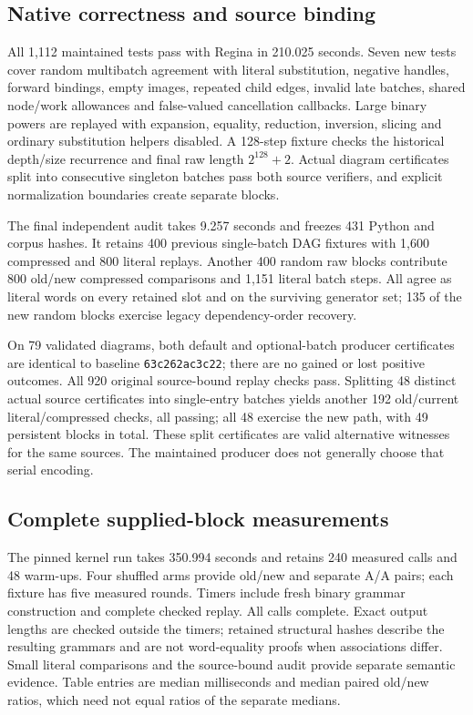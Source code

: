 \subsection{Native correctness and source binding}

All 1,112 maintained tests pass with Regina in 210.025 seconds. Seven new
tests cover random multibatch agreement with literal substitution, negative
handles, forward bindings, empty images, repeated child edges, invalid late
batches, shared node/work allowances and false-valued cancellation callbacks.
Large binary powers are replayed with expansion, equality, reduction, inversion,
slicing and ordinary substitution helpers disabled. A 128-step fixture checks
the historical depth/size recurrence and final raw length $2^{128}+2$.
Actual diagram certificates split into consecutive singleton batches pass both
source verifiers, and explicit normalization boundaries create separate blocks.

The final independent audit takes 9.257 seconds and freezes 431 Python and
corpus hashes. It retains 400 previous single-batch DAG fixtures with 1,600
compressed and 800 literal replays. Another 400 random raw blocks contribute
800 old/new compressed comparisons and 1,151 literal batch steps. All agree
as literal words on every retained slot and on the surviving generator set;
135 of the new random blocks exercise legacy dependency-order recovery.

On 79 validated diagrams, both default and optional-batch producer certificates
are identical to baseline \texttt{63c262ac3c22}; there are no gained or lost
positive outcomes. All 920 original source-bound replay checks pass. Splitting
48 distinct actual source certificates into single-entry batches yields
another 192 old/current literal/compressed checks, all passing; all 48 exercise
the new path, with 49 persistent blocks in total. These split certificates
are valid alternative witnesses for the same sources. The maintained producer
does not generally choose that serial encoding.

\subsection{Complete supplied-block measurements}

The pinned kernel run takes 350.994 seconds and retains 240 measured calls
and 48 warm-ups. Four shuffled arms provide old/new and separate A/A pairs;
each fixture has five measured rounds. Timers include fresh binary grammar
construction and complete checked replay. All calls complete. Exact output
lengths are checked outside the timers; retained structural hashes describe
the resulting grammars and are not word-equality proofs when associations
differ. Small literal comparisons and the source-bound audit provide separate
semantic evidence. Table entries are median milliseconds and median paired
old/new ratios, which need not equal ratios of the separate medians.

